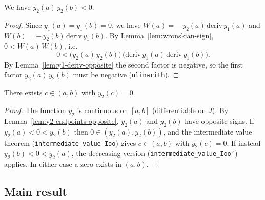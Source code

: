 \begin{lemma}
    \label{lem:y2-endpoints-opposite}
    \leanok
    We have $y_2(a)\,y_2(b) < 0$.
\end{lemma}
\begin{proof}
    Since $y_1(a) = y_1(b) = 0$, we have $W(a) = -\,y_2(a)\,\mathrm{deriv}\,y_1(a)$
    and $W(b) = -\,y_2(b)\,\mathrm{deriv}\,y_1(b)$. By
    Lemma~\ref{lem:wronskian-sign}, $0 < W(a)\,W(b)$, i.e.
    \[
        0 < \bigl(y_2(a)\,y_2(b)\bigr)\,\bigl(\mathrm{deriv}\,y_1(a)\,\mathrm{deriv}\,y_1(b)\bigr).
    \]
    By Lemma~\ref{lem:y1-deriv-opposite} the second factor is negative, so the
    first factor $y_2(a)\,y_2(b)$ must be negative (\texttt{nlinarith}).
\end{proof}

\begin{lemma}
    \label{lem:y2-zero-exists}
    \leanok
    There exists $c \in (a,b)$ with $y_2(c) = 0$.
\end{lemma}
\begin{proof}
    The function $y_2$ is continuous on $[a,b]$ (differentiable on $J$). By
    Lemma~\ref{lem:y2-endpoints-opposite}, $y_2(a)$ and $y_2(b)$ have opposite
    signs. If $y_2(a) < 0 < y_2(b)$ then $0 \in (y_2(a), y_2(b))$, and the
    intermediate value theorem (\texttt{intermediate\_value\_Ioo}) gives
    $c \in (a,b)$ with $y_2(c) = 0$. If instead $y_2(b) < 0 < y_2(a)$, the
    decreasing version (\texttt{intermediate\_value\_Ioo'}) applies. In either
    case a zero exists in $(a,b)$.
\end{proof}

\subsection{Main result}

